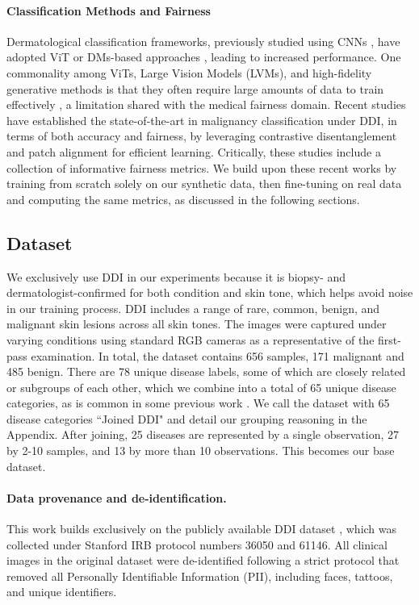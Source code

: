 \documentclass[11pt]{ucthesis}
\begin{document}
\paragraph{Classification Methods and Fairness} Dermatological classification frameworks, previously studied using CNNs \cite{han_2020_augmented}, have adopted ViT \cite{dosovitskiy-2020} or DMs-based approaches \cite{carrion-2023}, leading to increased performance. One commonality among ViTs, Large Vision Models (LVMs), and high-fidelity generative methods is that they often require large amounts of data to train effectively \cite{Moon2022FinetuningDM}, a limitation shared with the medical fairness domain. Recent studies have established the state-of-the-art in malignancy classification under DDI, in terms of both accuracy and fairness, by leveraging contrastive disentanglement \cite{du_2023_fairdisco} and patch alignment \cite{aayushman-2024} for efficient learning. Critically, these studies include a collection of informative fairness metrics. We build upon these recent works by training from scratch solely on our synthetic data, then fine-tuning on real data and computing the same metrics, as discussed in the following sections.

\subsection{Dataset}

\label{cgddi:sec:basedata}
We exclusively use DDI in our experiments because it is biopsy- and dermatologist-confirmed for both condition and skin tone, which helps avoid noise in our training process. DDI includes a range of rare, common, benign, and malignant skin lesions across all skin tones. The images were captured under varying conditions using standard RGB cameras as a representative of the first-pass examination. In total, the dataset contains 656 samples, 171 malignant and 485 benign. There are 78 unique disease labels, some of which are closely related or subgroups of each other, which we combine into a total of 65 unique disease categories, as is common in some previous work \cite{ham}. We call the dataset with 65 disease categories ``Joined DDI" and detail our grouping reasoning in the Appendix. After joining, 25 diseases are represented by a single observation, 27 by 2-10 samples, and 13 by more than 10 observations. This becomes our base dataset.

\paragraph{Data provenance and de-identification.}
This work builds exclusively on the publicly available DDI dataset \cite{daneshjou_2022_disparities}, which was collected under Stanford IRB protocol numbers 36050 and 61146. All clinical images in the original dataset were de-identified following a strict protocol that removed all Personally Identifiable Information (PII), including faces, tattoos, and unique identifiers.
\end{document}
